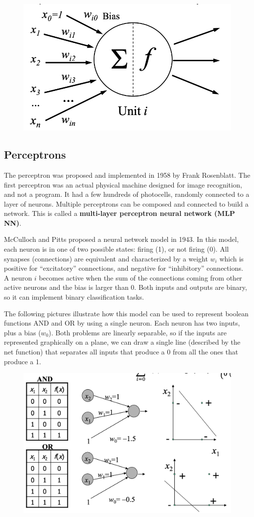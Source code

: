 \begin{figure}[h]
    \centering
    \includegraphics[width=0.5\linewidth]{img/Neuron.png}
\end{figure}

\subsection{Perceptrons}

The perceptron was proposed and implemented in 1958 by Frank Rosenblatt. The first perceptron was an actual physical machine designed for image recognition, and not a program. It had a few hundreds of photocells, randomly connected to a layer of neurons. Multiple perceptrons can be composed and connected to build a network. This is called a \textbf{multi-layer perceptron neural network (MLP NN)}. 

McCulloch and Pitts proposed a neural network model in 1943. In this model, each neuron is in one of two possible states: firing (1), or not firing (0). All synapses (connections) are equivalent and characterized by a weight $w_i$ which is positive for ``excitatory'' connections, and negative for ``inhibitory'' connections. A neuron $i$ becomes active when the sum of the connections coming from other active neurons and the bias is larger than 0. Both inputs and outputs are binary, so it can implement binary classification tasks.

The following pictures illustrate how this model can be used to represent boolean functions AND and OR by using a single neuron. Each neuron has two inputs, plus a bias ($w_0$). Both problems are linearly separable, so if the inputs are represented graphically on a plane, we can draw a single line (described by the net function) that separates all inputs that produce a 0 from all the ones that produce a 1.

\begin{figure}[h]
    \centering
    \includegraphics[width=0.5\linewidth]{img/boolean perceptron.png}
\end{figure}

